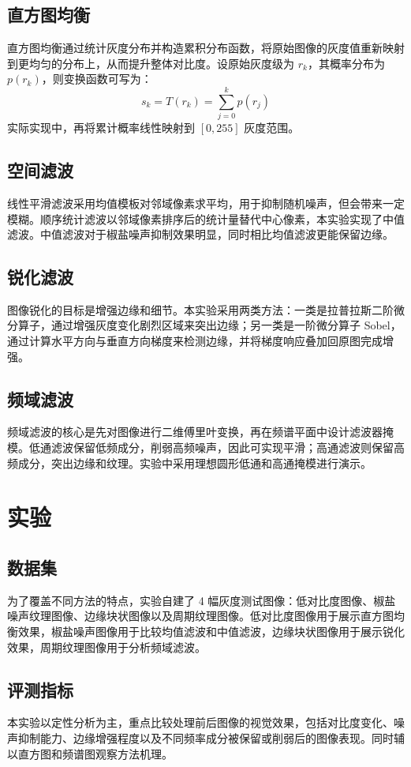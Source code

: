 \documentclass{report}
\begin{document}
\subsection{直方图均衡}
直方图均衡通过统计灰度分布并构造累积分布函数，将原始图像的灰度值重新映射到更均匀的分布上，从而提升整体对比度。设原始灰度级为 $r_k$，其概率分布为 $p(r_k)$，则变换函数可写为：
\[
s_k = T(r_k) = \sum_{j=0}^{k} p(r_j)
\]
实际实现中，再将累计概率线性映射到 $[0,255]$ 灰度范围。

\subsection{空间滤波}
线性平滑滤波采用均值模板对邻域像素求平均，用于抑制随机噪声，但会带来一定模糊。顺序统计滤波以邻域像素排序后的统计量替代中心像素，本实验实现了中值滤波。中值滤波对于椒盐噪声抑制效果明显，同时相比均值滤波更能保留边缘。

\subsection{锐化滤波}
图像锐化的目标是增强边缘和细节。本实验采用两类方法：一类是拉普拉斯二阶微分算子，通过增强灰度变化剧烈区域来突出边缘；另一类是一阶微分算子 Sobel，通过计算水平方向与垂直方向梯度来检测边缘，并将梯度响应叠加回原图完成增强。

\subsection{频域滤波}
频域滤波的核心是先对图像进行二维傅里叶变换，再在频谱平面中设计滤波器掩模。低通滤波保留低频成分，削弱高频噪声，因此可实现平滑；高通滤波则保留高频成分，突出边缘和纹理。实验中采用理想圆形低通和高通掩模进行演示。

\section{实验}
\subsection{数据集}
为了覆盖不同方法的特点，实验自建了 4 幅灰度测试图像：低对比度图像、椒盐噪声纹理图像、边缘块状图像以及周期纹理图像。低对比度图像用于展示直方图均衡效果，椒盐噪声图像用于比较均值滤波和中值滤波，边缘块状图像用于展示锐化效果，周期纹理图像用于分析频域滤波。

\subsection{评测指标}
本实验以定性分析为主，重点比较处理前后图像的视觉效果，包括对比度变化、噪声抑制能力、边缘增强程度以及不同频率成分被保留或削弱后的图像表现。同时辅以直方图和频谱图观察方法机理。
\end{document}
